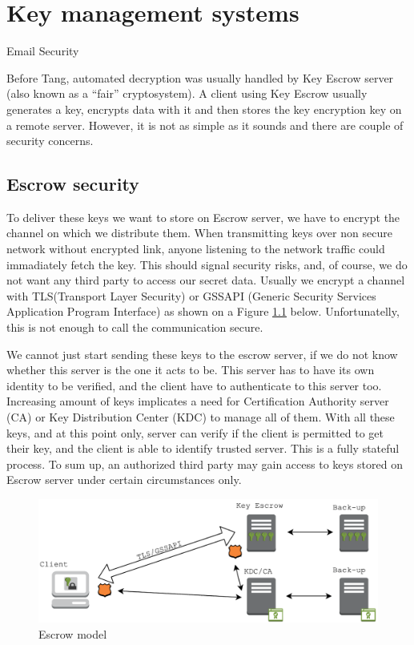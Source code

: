 \chapter{Key management systems}\label{escrow}


Email Security



Before Tang, automated decryption was usually handled by Key Escrow server (also known as a “fair” cryptosystem).
A client using Key Escrow usually generates a key, encrypts data with it and then stores the key encryption key on a remote server.
However, it is not as simple as it sounds and there are couple of security concerns.

\section{Escrow security}

To deliver these keys we want to store on Escrow server, we have to encrypt the channel on which we distribute them.
When transmitting keys over non secure network without encrypted link, anyone listening to the network traffic could immadiately fetch the key.
This should signal security risks, and, of course, we do not want any third party to access our secret data.
Usually we encrypt a channel with TLS(Transport Layer Security) or GSSAPI (Generic Security Services Application Program Interface) as shown on a Figure \ref{fig:escrowmodel} below.
Unfortunatelly, this is not enough to call the communication secure.

We cannot just start sending these keys to the escrow server, if we do not know whether this server is the one it acts to be.
This server has to have its own identity to be verified, and the client have to authenticate to this server too.
Increasing amount of keys implicates a need for Certification Authority server (CA) or Key Distribution Center (KDC) to manage all of them.
With all these keys, and at this point only, server can verify if the client is permitted to get their key, and the client is able to identify trusted server.
This is a fully stateful process.
To sum up, an authorized third party may gain access to keys stored on Escrow server under certain circumstances only.

\begin{figure}[h]
    \centering
    \includegraphics[scale=0.7]{figures/EscrowModel.pdf}
    \caption{Escrow model}
    \label{fig:escrowmodel}
\end{figure}

